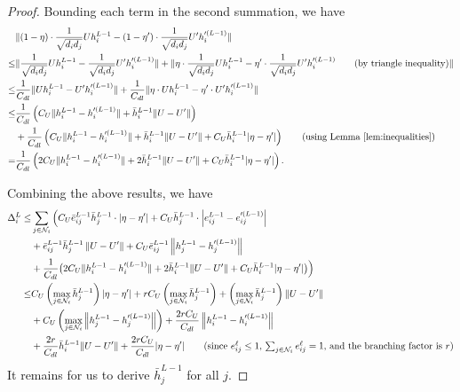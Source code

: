 \begin{proof}
    Bounding each term in the second summation, we have 
    \begin{align*}
        &\|(1 - \eta) \cdot \frac{1}{\sqrt{d_i d_j }} U  h_i^{L-1} - (1 - \eta^\prime) \cdot \frac{1}{\sqrt{d_i d_j }} U^{\prime}  h_i^{\prime (L-1)}\|\\
        \leq & \|\frac{1}{\sqrt{d_i d_j }} U  h_i^{L-1} - \frac{1}{\sqrt{d_i d_j }} U^{\prime}  h_i^{\prime (L-1)}\| 
        + \|\eta \cdot \frac{1}{\sqrt{d_i d_j }} U  h_i^{L-1} -\eta^\prime \cdot \frac{1}{\sqrt{d_i d_j }} U^{\prime }  h_i^{\prime (L-1)} \tag{by triangle inequality}\|\\
        \leq & \frac{1}{C_{dl}} \|U  h_i^{L-1} - U^{\prime}  h_i^{\prime (L-1)}\| 
        + \frac{1}{C_{dl}} \|\eta \cdot U  h_i^{L-1} -\eta^\prime \cdot U^{\prime }  h_i^{\prime (L-1)}\|\\
        \leq& \frac{1}{C_{dl}}\left(C_U \|h_i^{L-1} - h_i^{\prime (L-1)}\| + \bar h_i^{L-1} \|U - U^{\prime }\|\right)\\
        &+ \frac{1}{C_{dl}}\left(C_U \|h_i^{L-1} - h_i^{\prime (L-1)}\| + \bar h_i^{L-1} \|U - U^{\prime}\|
        + C_U \bar h_i^{L-1} |\eta - \eta^\prime|\right)\tag{using Lemma~\ref{lem:inequalities}}\\
        = & \frac{1}{C_{dl}}\left(2C_U \|h_i^{L-1} - h_i^{\prime (L-1)}\| + 2\bar h_i^{L-1} \|U - U^{\prime}\|
        + C_U \bar h_i^{L-1} |\eta - \eta^\prime|\right).
    \end{align*}
    
    Combining the above results, we have
    \begin{align*}
        \Delta_i^L 
        \leq & \sum_{j \in \mathcal{N}_i} \Big( C_U \bar e_{ij}^{L-1} \bar h_j^{L-1} \cdot \left|\eta - \eta^\prime\right|
        + C_U \bar h_j^{L-1}\cdot \left|e_{ij}^{L-1} - e_{ij}^{\prime (L-1)}\right|\\
        &+ \bar e_{ij}^{L-1} \bar h_j^{L-1} \left\|U - U^{\prime}\right\|
        + C_U \bar e_{ij}^{L-1}\left \|h_j^{L-1} - h_j^{\prime (L-1)}\right\|\\
        &+ \frac{1}{C_{dl}}\big(2C_U \|h_i^{L-1} - h_i^{\prime (L-1)}\| + 2\bar h_i^{L-1} \|U - U^{\prime}\|
        + C_U \bar h_i^{L-1} |\eta - \eta^\prime|\big) \Big)
        \\
        \leq& C_U \left(\max_{j \in \mathcal{N}_i}\bar h_j^{L-1}\right) |\eta - \eta^\prime|
        +  rC_U \left(\max_{j \in \mathcal{N}_i}\bar h_j^{L-1}\right)
        + \left(\max_{j \in \mathcal{N}_i}\bar h_j^{L-1}\right) \|U - U^{\prime}\| \\
        &+ C_U \left(\max_{j \in \mathcal{N}_i}\left\|h_j^{L-1} - h_j^{\prime (L-1)}\right\|\right)
        + \frac{2rC_U}{C_{dl}}\left\|h_i^{L-1} - h_i^{\prime (L-1)}\right\|\\
        &+ \frac{2r}{C_{dl}} \bar h_i^{L-1} \|U - U^{\prime}\| + \frac{2rC_U}{C_{dl}}|\eta - \eta^\prime|
        \tag{since $e_{ij}^\ell \leq 1$, $\sum_{j \in \mathcal{N}_i} e_{ij}^\ell = 1$, and the branching factor is $r$}
    \end{align*}
    It remains for us to derive $\bar h_j^{L-1}$ for all $j$.
\end{proof}

